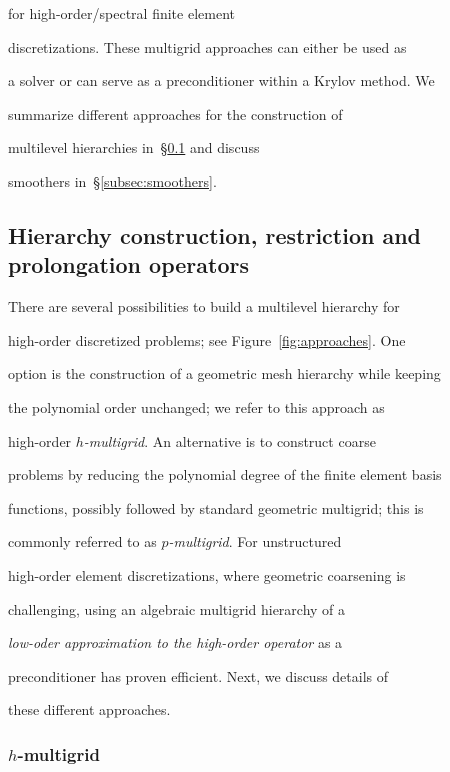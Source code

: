 \documentclass[smallcondensed,final]{svjour3}     %
\begin{document}
for high-order/spectral finite element

discretizations. These multigrid approaches can either be used as

a solver or can serve as a preconditioner within a Krylov method. We

summarize different approaches for the construction of

multilevel hierarchies in~\S\ref{subsec:hierarchy} and discuss

smoothers in~\S\ref{subsec:smoothers}.





\subsection{Hierarchy construction, restriction and prolongation operators}\label{subsec:hierarchy}

There are several possibilities to build a multilevel hierarchy for

high-order discretized problems; see Figure~\ref{fig:approaches}. One

option is the construction of a geometric mesh hierarchy while keeping

the polynomial order unchanged; we refer to this approach as

high-order \emph{$h$-multigrid}. An alternative is to construct coarse

problems by reducing the polynomial degree of the finite element basis

functions, possibly followed by standard geometric multigrid; this is

commonly referred to as \emph{$p$-multigrid}. For unstructured

high-order element discretizations, where geometric coarsening is

challenging, using an algebraic multigrid hierarchy of a

\emph{low-oder approximation to the high-order operator} as a

preconditioner has proven efficient. Next, we discuss details of

these different approaches.







\subsubsection{$h$-multigrid}\label{subsec:h}
\end{document}
